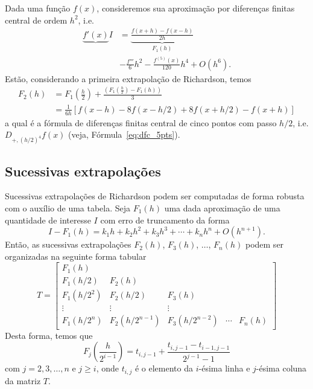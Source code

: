 \begin{ex}
  Dada uma função $f(x)$, consideremos sua aproximação por diferenças finitas central de ordem $h^2$, i.e.
  \begin{align}
    \underbrace{f'(x)}{I} &= \underbrace{\frac{f(x+h)-f(x-h)}{2h}}_{F_1(h)} \nonumber \\
                          &- \frac{f'''}{6}h^2 - \frac{f^{(5)}(x)}{120}h^4 + O(h^6).
  \end{align}
Estão, considerando a primeira extrapolação de Richardson, temos
\begin{align}
  F_2(h) &= F_1\left(\frac{h}{2}\right) + \frac{\left(F_1\left(\frac{h}{2}\right) - F_1(h)\right)}{3}\\
  &= \frac{1}{6h}\left[f(x-h)-8f(x-h/2)+8f(x+h/2)-f(x+h)\right]
\end{align}
a qual é a fórmula de diferenças finitas central de cinco pontos com passo $h/2$, i.e. $D_{+,(h/2)^4}f(x)$ (veja, Fórmula~\eqref{eq:dfc_5pts}).
\end{ex}

\subsection{Sucessivas extrapolações}

Sucessivas extrapolações de Richardson podem ser computadas de forma robusta com o auxílio de uma tabela. Seja $F_1(h)$ uma dada aproximação de uma quantidade de interesse $I$ com erro de truncamento da forma
\begin{equation}
  I-F_1(h) = k_1h + k_2h^2 + k_3h^3 + \cdots + k_nh^n + O(h^{n+1}).
\end{equation}
Então, as sucessivas extrapolações $F_2(h)$, $F_3(h)$, $\dotsc$, $F_n(h)$ podem ser organizadas na seguinte forma tabular
\begin{equation}
  T = \left[\begin{array}{lllll}
    F_1(h)\\
    F_1(h/2) & F_2(h) \\
    F_1(h/2^2) & F_2(h/2) & F_3(h) \\
    \vdots & \vdots & \vdots \\
    F_1(h/2^n) & F_2(h/2^{n-1}) & F_3(h/2^{n-2}) & \cdots & F_n(h)
  \end{array}\right]
\end{equation}
Desta forma, temos que
\begin{equation}
  F_j\left(\frac{h}{2^{i-1}}\right) = t_{i,j-1} + \frac{t_{i,j-1}-t_{i-1,j-1}}{2^{j-1}-1}
\end{equation}
com $j=2, 3, \dotsc, n$ e $j\geq i$, onde $t_{i,j}$ é o elemento da $i$-ésima linha e $j$-ésima coluna da matriz $T$.

